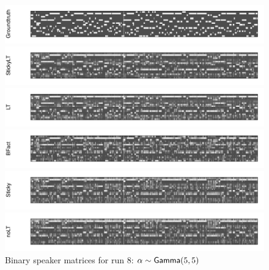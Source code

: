 \begin{figure}[tb]
\begin{center}
  \centerline{\includegraphics[width = \textwidth, height = 0.2\textwidth]{fig/cocktail/synth_s16_m12/hyper_alpha/h10.0_nocs_cp0/a5b5/groundtruth.pdf}}
  \centerline{\includegraphics[width = \textwidth, height = 0.2\textwidth]{fig/cocktail/synth_s16_m12/hyper_alpha/h10.0_nocs_cp0/a5b5/StickyLT_hdp_hmm_w0_aalpha5_balpha5/binary_state.pdf}}
  \centerline{\includegraphics[width = \textwidth, height = 0.2\textwidth]{fig/cocktail/synth_s16_m12/hyper_alpha/h10.0_nocs_cp0/a5b5/LT_hdp_hmm_w0_aalpha5_balpha5/binary_state.pdf}}
  \centerline{\includegraphics[width = \textwidth, height = 0.2\textwidth]{fig/cocktail/synth_s16_m12/hyper_alpha/h10.0_nocs_cp0/a5b5/BFact_hmm_w0_aalpha5_balpha5/binary_state.pdf}}
  \centerline{\includegraphics[width = \textwidth, height = 0.2\textwidth]{fig/cocktail/synth_s16_m12/hyper_alpha/h10.0_nocs_cp0/a5b5/Sticky_hdp_hmm_w0_aalpha5_balpha5/binary_state.pdf}}
  \centerline{\includegraphics[width = \textwidth, height = 0.2\textwidth]{fig/cocktail/synth_s16_m12/hyper_alpha/h10.0_nocs_cp0/a5b5/noLT_hdp_hmm_w0_aalpha5_balpha5/binary_state.pdf}}
\caption{Binary speaker matrices for run 8: $\alpha \sim \mathsf{Gamma}(5,5)$}
\end{center}
\end{figure}


